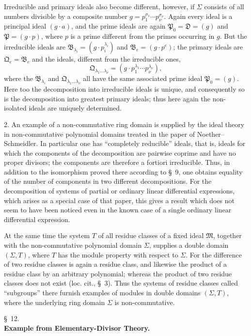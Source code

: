 \documentclass[11pt]{article}
\providecommand{\ideal}[1]{\mathfrak{#1}}
\begin{document}
Irreducible and primary ideals also become different, however, if $\Sigma$ consists of all numbers divisible by a composite number $g=p_1^{\sigma_1}\cdots p_\nu^{\sigma_\nu}$. Again every ideal is a principal ideal $(g\cdot a)$, and the prime ideals are again $\ideal P_0=\ideal D=(g)$ and $\ideal P=(g\cdot p)$, where $p$ is a prime different from the primes occurring in $g$. But the irreducible ideals are $\ideal B_{\lambda_i}=(g\cdot p_i^{\lambda_i})$ and $\ideal B_e=(g\cdot p^e)$; the primary ideals are $\ideal Q_e=\ideal B_e$ and the ideals, different from the irreducible ones,
\[
 \ideal Q_{\lambda_1\ldots\lambda_\nu}=(g\cdot p_1^{\lambda_1}\cdots p_\nu^{\lambda_\nu}),
\]
where the $\ideal B_{\lambda_i}$ and $\ideal Q_{\lambda_1\ldots\lambda_\nu}$ all have the same associated prime ideal $\ideal P_0=(g)$. Here too the decomposition into irreducible ideals is unique, and consequently so is the decomposition into greatest primary ideals; thus here again the non-isolated ideals are uniquely determined.

2. An example of a non-commutative ring domain is supplied by the ideal theory in non-commutative polynomial domains treated in the paper of Noether--Schmeidler. In particular one has ``completely reducible'' ideals, that is, ideals for which the components of the decomposition are pairwise coprime and have no proper divisors; the components are therefore a fortiori irreducible. Thus, in addition to the isomorphism proved there according to \S~9, one obtains equality of the number of components in two different decompositions. For the decomposition of systems of partial or ordinary linear differential expressions, which arises as a special case of that paper, this gives a result which does not seem to have been noticed even in the known case of a single ordinary linear differential expression.

At the same time the system $T$ of all residue classes of a fixed ideal $\ideal M$, together with the non-commutative polynomial domain $\Sigma$, supplies a double domain $(\Sigma,T)$, where $T$ has the module property with respect to $\Sigma$. For the difference of two residue classes is again a residue class, and likewise the product of a residue class by an arbitrary polynomial; whereas the product of two residue classes does not exist (loc. cit., \S~3). Thus the systems of residue classes called ``subgroups'' there furnish examples of modules in double domains $(\Sigma,T)$, where the underlying ring domain $\Sigma$ is non-commutative.

\begin{center}
\S~12.\\[0.25em]
\textbf{Example from Elementary-Divisor Theory.}
\end{center}
\end{document}
